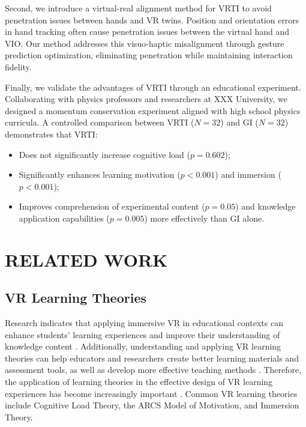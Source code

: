 \documentclass[runningheads]{llncs}
\begin{document}
Second, we introduce a virtual-real alignment method for VRTI to avoid penetration issues between hands and VR twins. Position and orientation errors in hand tracking often cause penetration issues between the virtual hand and VIO. Our method addresses this visuo-haptic misalignment through gesture prediction optimization, eliminating penetration while maintaining interaction fidelity.

Finally, we validate the advantages of VRTI through an educational experiment. Collaborating with physics professors and researchers at XXX
University, we designed a momentum conservation experiment aligned with high school physics curricula. A controlled comparison between VRTI ($N=32$) and GI ($N=32$) demonstrates that VRTI:

\begin{itemize}
  \item Does not significantly increase cognitive load ($p = 0.602$);

  \item Significantly enhances learning motivation ($p < 0.001$) and immersion ($p < 0.001$);

  \item Improves comprehension of experimental content ($p = 0.05$) and knowledge application capabilities ($p = 0.005$) more effectively than GI alone.
\end{itemize}

\section{RELATED WORK}
\subsection{VR Learning Theories}
Research indicates that applying immersive VR in educational contexts can enhance students' learning experiences and improve their understanding of knowledge content \cite{freina2015literature}. Additionally, understanding and applying VR learning theories can help educators and researchers create better learning materials and assessment tools, as well as develop more effective teaching methods \cite{matovu2023immersive}. Therefore, the application of learning theories in the effective design of VR learning experiences has become increasingly important \cite{marougkas2023virtual}. Common VR learning theories include Cognitive Load Theory, the ARCS Model of Motivation, and Immersion Theory.
\end{document}
